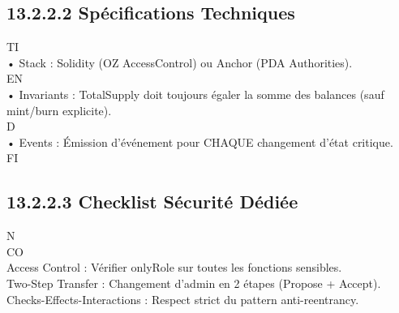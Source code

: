 \documentclass[12pt,landscape,a4paper]{article}
\begin{document}
\subsection{13.2.2.2 Spécifications Techniques}
\vspace{0.5em}
\vspace{0.5em}
\vspace{0.5em}
\vspace{0.5em}
TI\\
• Stack : Solidity (OZ AccessControl) ou Anchor (PDA Authorities).\\
\vspace{0.5em}
\vspace{0.5em}
\vspace{0.5em}
\vspace{0.5em}
EN\\
• Invariants : TotalSupply doit toujours égaler la somme des balances (sauf mint/burn explicite).\\
\vspace{0.5em}
\vspace{0.5em}
\vspace{0.5em}
\vspace{0.5em}
D\\
• Events : Émission d’événement pour CHAQUE changement d’état critique.\\
\vspace{0.5em}
\vspace{0.5em}
\vspace{0.5em}
\vspace{0.5em}
FI\\
\subsection{13.2.2.3 Checklist Sécurité Dédiée}
N\\
CO\\
Access Control : Vérifier onlyRole sur toutes les fonctions sensibles.\\
\vspace{0.5em}
Two-Step Transfer : Changement d’admin en 2 étapes (Propose + Accept).\\
\vspace{0.5em}
Checks-Effects-Interactions : Respect strict du pattern anti-reentrancy.\\
\vspace{0.5em}
\vspace{0.5em}
\end{document}
